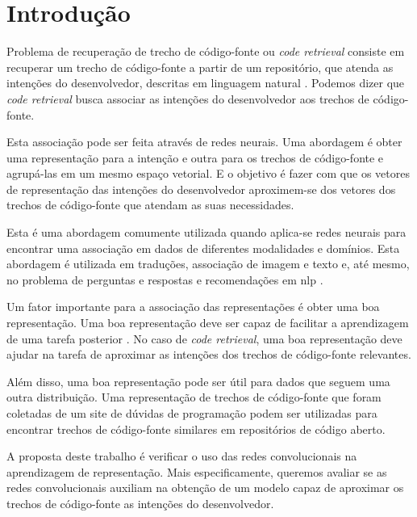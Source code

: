 \chapter{Introdução}
\label{cap:introducao}


Problema de recuperação de trecho de código-fonte ou \textit{code retrieval} consiste em recuperar um trecho de código-fonte a partir de um repositório, que atenda as intenções do desenvolvedor, descritas em linguagem natural \citep{cambronero-deep-learning-code-search:2019}. Podemos dizer que \textit{code retrieval} busca associar as intenções do desenvolvedor aos trechos de código-fonte.

Esta associação pode ser feita através de redes neurais. Uma abordagem é obter uma representação para a intenção e outra para os trechos de código-fonte e agrupá-las em um mesmo espaço vetorial. E o objetivo é fazer com que os vetores de representação das intenções do desenvolvedor aproximem-se dos vetores dos trechos de código-fonte que atendam as suas necessidades. 

Esta é uma abordagem comumente utilizada quando aplica-se redes neurais para encontrar uma associação em dados de diferentes modalidades e domínios. Esta abordagem é utilizada em traduções, associação de imagem e texto e, até mesmo, no problema de perguntas e respostas e recomendações em \acrshort{nlp} \citep{lai-etal-2018-review, Zhang:2019:deep-learning-recommender-survey}.

Um fator importante para a associação das representações é obter uma boa representação. Uma boa representação deve ser capaz de facilitar a aprendizagem de uma tarefa posterior \citep{Goodfellow-et-al-2016:representation-learning}. No caso de \textit{code retrieval}, uma boa representação deve ajudar na tarefa de aproximar as intenções dos trechos de código-fonte relevantes. 

Além disso, uma boa representação pode ser útil para dados que seguem uma outra distribuição. Uma representação de trechos de código-fonte que foram coletadas de um site de dúvidas de programação podem ser utilizadas para encontrar trechos de código-fonte similares em repositórios de código aberto.

A proposta deste trabalho é verificar o uso das redes convolucionais na aprendizagem de representação. Mais especificamente, queremos avaliar se as redes convolucionais auxiliam na obtenção de um modelo capaz de aproximar os trechos de código-fonte as intenções do desenvolvedor.

